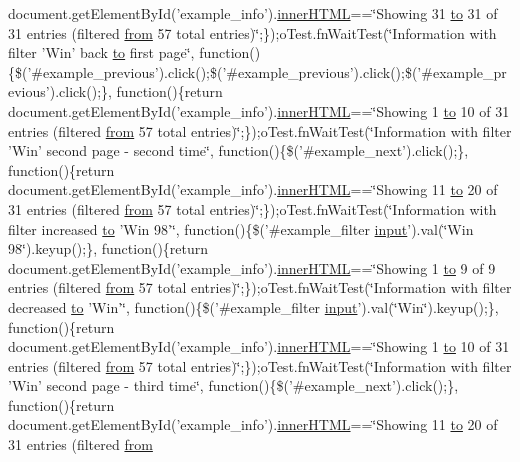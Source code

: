 \begin{DoxyCompactItemize}
document.\+get\+Element\+By\+Id('example\+\_\+info').\hyperlink{jquery-ui_8js_a87f73c4f0391c1cf9fe60374a76d9a7b}{inner\+H\+T\+M\+L}==\char`\"{}Showing 31 \hyperlink{jquery-ui_8js_af6086621f45baa2cf538f19e45d3c263}{to} 31 of 31 entries (filtered \hyperlink{jquery-ui_8js_ace03b192fd101a1c5648340bc09b7229}{from} 57 total entries)\char`\"{};\});o\+Test.\+fn\+Wait\+Test(\char`\"{}Information with filter 'Win' back \hyperlink{jquery-ui_8js_af6086621f45baa2cf538f19e45d3c263}{to} first page\char`\"{}, function()\{\$('\#example\+\_\+previous').click();\$('\#example\+\_\+previous').click();\$('\#example\+\_\+previous').click();\}, function()\{return document.\+get\+Element\+By\+Id('example\+\_\+info').\hyperlink{jquery-ui_8js_a87f73c4f0391c1cf9fe60374a76d9a7b}{inner\+H\+T\+M\+L}==\char`\"{}Showing 1 \hyperlink{jquery-ui_8js_af6086621f45baa2cf538f19e45d3c263}{to} 10 of 31 entries (filtered \hyperlink{jquery-ui_8js_ace03b192fd101a1c5648340bc09b7229}{from} 57 total entries)\char`\"{};\});o\+Test.\+fn\+Wait\+Test(\char`\"{}Information with filter 'Win' second page -\/ second time\char`\"{}, function()\{\$('\#example\+\_\+next').click();\}, function()\{return document.\+get\+Element\+By\+Id('example\+\_\+info').\hyperlink{jquery-ui_8js_a87f73c4f0391c1cf9fe60374a76d9a7b}{inner\+H\+T\+M\+L}==\char`\"{}Showing 11 \hyperlink{jquery-ui_8js_af6086621f45baa2cf538f19e45d3c263}{to} 20 of 31 entries (filtered \hyperlink{jquery-ui_8js_ace03b192fd101a1c5648340bc09b7229}{from} 57 total entries)\char`\"{};\});o\+Test.\+fn\+Wait\+Test(\char`\"{}Information with filter increased \hyperlink{jquery-ui_8js_af6086621f45baa2cf538f19e45d3c263}{to} 'Win 98'\char`\"{}, function()\{\$('\#example\+\_\+filter \hyperlink{validate_8js_a07a2aabd64594dc36dd810cad2669deb}{input}').val(\char`\"{}Win 98\char`\"{}).keyup();\}, function()\{return document.\+get\+Element\+By\+Id('example\+\_\+info').\hyperlink{jquery-ui_8js_a87f73c4f0391c1cf9fe60374a76d9a7b}{inner\+H\+T\+M\+L}==\char`\"{}Showing 1 \hyperlink{jquery-ui_8js_af6086621f45baa2cf538f19e45d3c263}{to} 9 of 9 entries (filtered \hyperlink{jquery-ui_8js_ace03b192fd101a1c5648340bc09b7229}{from} 57 total entries)\char`\"{};\});o\+Test.\+fn\+Wait\+Test(\char`\"{}Information with filter decreased \hyperlink{jquery-ui_8js_af6086621f45baa2cf538f19e45d3c263}{to} 'Win'\char`\"{}, function()\{\$('\#example\+\_\+filter \hyperlink{validate_8js_a07a2aabd64594dc36dd810cad2669deb}{input}').val(\char`\"{}Win\char`\"{}).keyup();\}, function()\{return document.\+get\+Element\+By\+Id('example\+\_\+info').\hyperlink{jquery-ui_8js_a87f73c4f0391c1cf9fe60374a76d9a7b}{inner\+H\+T\+M\+L}==\char`\"{}Showing 1 \hyperlink{jquery-ui_8js_af6086621f45baa2cf538f19e45d3c263}{to} 10 of 31 entries (filtered \hyperlink{jquery-ui_8js_ace03b192fd101a1c5648340bc09b7229}{from} 57 total entries)\char`\"{};\});o\+Test.\+fn\+Wait\+Test(\char`\"{}Information with filter 'Win' second page -\/ third time\char`\"{}, function()\{\$('\#example\+\_\+next').click();\}, function()\{return document.\+get\+Element\+By\+Id('example\+\_\+info').\hyperlink{jquery-ui_8js_a87f73c4f0391c1cf9fe60374a76d9a7b}{inner\+H\+T\+M\+L}==\char`\"{}Showing 11 \hyperlink{jquery-ui_8js_af6086621f45baa2cf538f19e45d3c263}{to} 20 of 31 entries (filtered \hyperlink{jquery-ui_8js_ace03b192fd101a1c5648340bc09b7229}{from} 
\end{DoxyCompactItemize}

